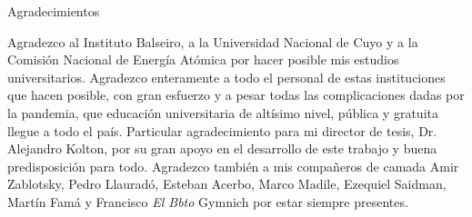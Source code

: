 \documentclass[12pt,screen,twoside]{ibtesis}
\begin{document}
\begin{postliminary}
\begin{seccion}{Agradecimientos}
  
Agradezco al Instituto Balseiro, a la Universidad Nacional de Cuyo y a la Comisión Nacional de Energía Atómica por hacer posible mis estudios universitarios. 
Agradezco enteramente a todo el personal de estas instituciones que hacen posible, con gran esfuerzo y a pesar todas las complicaciones dadas por la pandemia, que 
educación universitaria de altísimo nivel, pública y gratuita llegue a todo el país. Particular agradecimiento para mi director de tesis, Dr. Alejandro Kolton, 
por su gran apoyo en el desarrollo de este trabajo y buena predisposición para todo. Agradezco también a mis compañeros de camada Amir Zablotsky, Pedro
Llauradó, Esteban Acerbo, Marco Madile, Ezequiel Saidman, Martín Famá y Francisco \textit{El Bbto} Gymnich por estar siempre presentes.

\end{seccion}
\end{postliminary}
\end{document}
